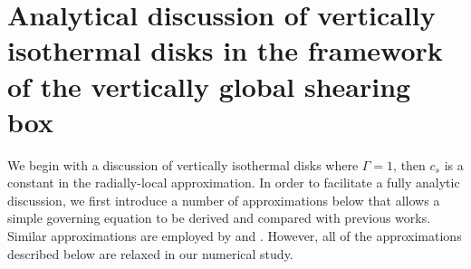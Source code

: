 \section{Analytical discussion of vertically isothermal
  disks in the framework of the vertically global shearing
  box}\label{analytical}  
We begin with a discussion of vertically isothermal disks
where $\Gamma=1$, then $c_s$ is a constant in the radially-local
approximation. 
In order to facilitate a fully analytic discussion, we first introduce a
number of approximations below that allows a simple governing equation
to be derived and compared with previous works. Similar approximations
are employed by \cite{nelson13} and \cite{barker15}. However, all of
the approximations described below are relaxed in our numerical study.     




